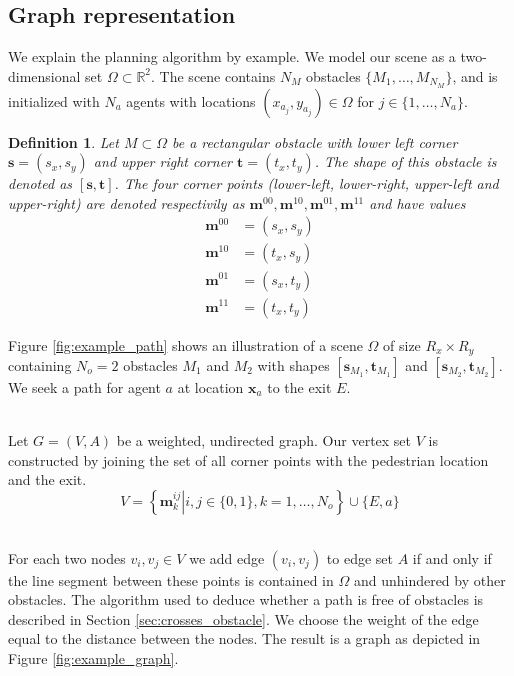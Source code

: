 \documentclass{article}
\renewcommand{\vec}[1]{\mathbf{#1}}
\newtheorem{newdef}{Definition}
\begin{document}
\subsection{Graph representation}
We explain the planning algorithm by example. We model our scene as a two-dimensional set $\Omega \subset \mathbb{R}^2$. The scene contains $N_M$ obstacles $\{M_1,\dots,M_{N_M}\}$, and is initialized with $N_a$ agents with locations $(x_{a_j},y_{a_j}) \in \Omega$ for $j \in \{1,\dots,N_a\}$. 
\begin{newdef}
	Let $M \subset \Omega$ be a rectangular obstacle with lower left corner $\vec{s}=(s_x,s_y)$ and upper right corner $\vec{t}=(t_x,t_y)$. The shape of this obstacle is denoted as $[\vec{s},\vec{t}]$. The four corner points (lower-left, lower-right, upper-left and upper-right) are denoted respectivily as $\vec{m}^{00},\vec{m}^{10},\vec{m}^{01},\vec{m}^{11}$ and have values
	\begin{align}
		\vec{m}^{00}&=(s_x,s_y)\\
		\vec{m}^{10}&=(t_x,s_y)\\
		\vec{m}^{01}&=(s_x,t_y)\\
		\vec{m}^{11}&=(t_x,t_y)
		\label{eq:corner_points}
	\end{align}
\end{newdef}
Figure \ref{fig:example_path} shows an illustration of a scene $\Omega$ of size $R_x\times R_y$ containing $N_o = 2$ obstacles $M_1$ and $M_2$ with shapes $[\vec{s}_{M_1},\vec{t}_{M_1}]$ and $[\vec{s}_{M_2},\vec{t}_{M_2}]$. We seek a path for agent $a$ at location $\vec{x}_a$ to the exit $E$.

\ \\
Let $G = (V,A)$ be a weighted, undirected graph. 
Our vertex set $V$ is constructed by joining the set of all corner points with the pedestrian location and the exit.
\begin{equation}
	V = \left\{\left.\vec{m}^{ij}_k \right| i,j \in \{0,1\}, k = 1,\dots,N_o \right\} \cup \{E,a\}
	\label{eq:vertex_set_construction}
\end{equation}

\ \\
For each two nodes $v_i,v_j\in V$ we add edge $(v_i,v_j)$ to edge set $A$ if and only if the line segment between these points is contained in $\Omega$ and unhindered by other obstacles. The algorithm used to deduce whether a path is free of obstacles is described in Section \ref{sec:crosses_obstacle}. We choose the weight of the edge equal to the distance between the nodes. The result is a graph as depicted in Figure \ref{fig:example_graph}.
\end{document}
